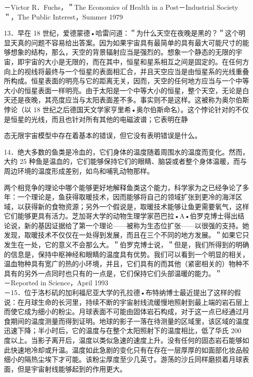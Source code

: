 －Victor R．Fuchs，＂The Economics of Health in a Post－Industrial Society＂，The Public Interest，Summer 1979

13．早在 18 世纪，爱德蒙德•哈雷问道：＂为什么天空在夜晚是黑的？＂这个明显天真的问题不容易给出答案。因为如果宇宙具有最简单的具有最大可能尺寸的能够想象的结构，那么，天空的背景辐射应当是强烈的。想象一个静态的无限的宇宙，即宇宙的大小是无限的，而在其中，恒星和星系相互之间是固定的。在任何方向上的视线将最终与一个恒星的表面相汇合，并且天空应当是由恒星系的光线重叠所构成。恒星表面的明亮与它的距离无关，因而，天空的任何地方应当与一个中等大小的恒星表面一样明亮。由于太阳是一个中等大小的恒星，整个天空，无论是白天还是夜晚，其亮度应当与太阳表面差不多。事实则不是这样。这被称为奥尔伯斯悖论（以 18 世纪之后德国天文学家亨里希•奥尔伯斯命名）。这个悖论针对的不仅是恒星的光线，而且也针对所有其他的电磁波谱；它表明在静

态无限宇宙模型中存在着基本的错误，但它没有表明错误是什么。

14．绝大多数的鱼类是冷血的，它们身体的温度随着周围水的温度而变化。然而，大约 25 种鱼是温血的，它们能够保持它们的眼睛、脑袋或者整个身体温暖，而与周边环境的温度形成差别，如鸟和哺乳动物那样。

两个相竞争的理论中哪个能够更好地解释鱼类这个能力，科学家为之已经争论了多年：一个理论是，鱼获得取暖技术，因而能够将自己的领域扩张到更冷的海洋区域，以获得新的食物资源；另外一个假说是，取暖技术能够让鱼更需要氧气，这样它们能够更具有活力。芝加哥大学的动物生理学家芭巴拉•A•伯罗克博士得出结论说，新的基因证据给了第一个理论——被称为生态位扩张——以很强的支持。她发现，取暖技术不仅仅在一处得到发展，而且在三个不同的地方发展。＂如果它只发生在一处，它的意义不会那么大。＂伯罗克博士说，＂但是，我们所得到的明确的信息是，保持中枢神经和眼睛的温度具有优势。我们可以看到一个明显的相关，温血物种具有宽广的热的小环境，并且，它们具有的而其他（紧密相关的）物种不具有的另外一点同时也只有的一点是，它们保持它们头部温暖的能力。＂\\
－Reported in Science，April 1993\\
－15．位于洛杉矶的加利福尼亚大学的孔拉德•布特纳博士最近提出了这样的假说：在月球生命的长河里，持续不断的宇宙射线流缓慢地照射到最上端的岩石层上而使它成为细小的粉尘。月球表面不可能由固体岩石构成，对于这一点已经通过月食期间的温度测量而得到证明。地球的影子一落在待测量的区域里，该区域的温度迅速下降；半小时后，它的温度与在整个太阳照射下的温度相比，低了华氏 200 度以上。当影子离开后，温度以类似急速的速度上升。没有任何的固态岩石能够如此快速地冷却或升温。温度如此急剧的变化只有在存在一层厚厚的如面部化妆品般细小的隔热尘埃下才可能。该粉尘厚度至少几英寸。游荡的沙丘同样磨损着月球表面，但是宇宙射线能够起到的作用更大。

